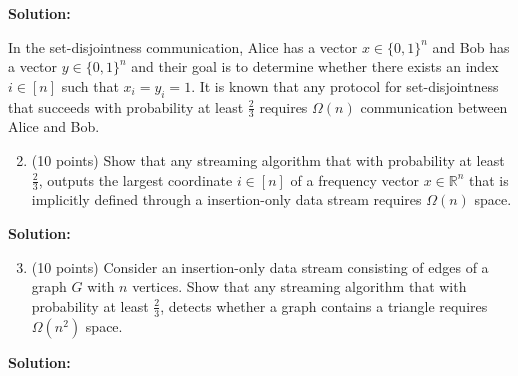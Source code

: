 \documentclass[11pt]{article}
\begin{document}
\noindent\textbf{Solution:}




\vskip 0.1in\noindent
In the set-disjointness communication, Alice has a vector $x\in\{0,1\}^n$ and Bob has a vector $y\in\{0,1\}^n$ and their goal is to determine whether there exists an index $i\in[n]$ such that $x_i=y_i=1$. 
It is known that any protocol for set-disjointness that succeeds with probability at least $\frac{2}{3}$ requires $\Omega(n)$ communication between Alice and Bob.
\vskip 0.1in\noindent
\begin{enumerate}
\setcounter{enumi}{1}
\item (10 points)
Show that any streaming algorithm that with probability at least $\frac{2}{3}$, outputs the largest coordinate $i\in[n]$ of a frequency vector $x\in\mathbb{R}^n$ that is implicitly defined through a insertion-only data stream requires $\Omega(n)$ space. 
\end{enumerate}


\noindent\textbf{Solution:}












\begin{enumerate}
\setcounter{enumi}{2}
\item (10 points)
Consider an insertion-only data stream consisting of edges of a graph $G$ with $n$ vertices. 
Show that any streaming algorithm that with probability at least $\frac{2}{3}$, detects whether a graph contains a triangle requires $\Omega(n^2)$ space.
\end{enumerate}

\noindent\textbf{Solution:}
\end{document}
